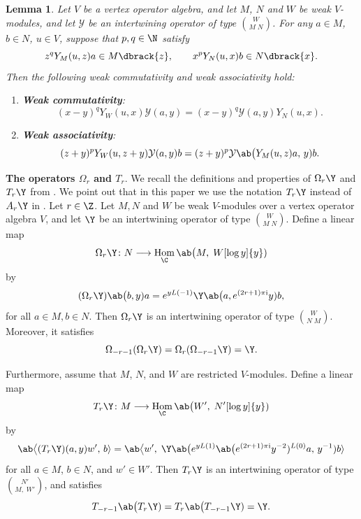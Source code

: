 \documentclass[12pt, english]{article}
\numberwithin{equation}{section}
\DeclareMathOperator{\Hom}{Hom}
\theoremstyle{plain}
\newtheorem{lemma}{Lemma}[section]
\theoremstyle{definition}
\theoremstyle{remark}
\begin{document}
	\begin{lemma}
		Let $V$ be a vertex operator algebra, and let $M$, $N$ and $W$ be weak $V$-modules, and let $\mathcal{Y}$ be an intertwining operator of type $\binom{W}{M\;N}$.
		For any $a \in M$, $b \in N$, $u \in V$, suppose that $p, q \in \N$ satisfy
		\[
		z^q Y_{M}(u, z) a \in M\dbrack{z}, \qquad x^p Y_{N}(u, x) b \in N\dbrack{x}.
		\]
		Then the following \emph{weak commutativity} and \emph{weak associativity} hold:
		\begin{enumerate}[label=(\arabic*),ref=\arabic*]
			\item \textbf{Weak commutativity}:
			\[
			(x-y)^q Y_{W}(u, x) \mathcal{Y}(a, y) = (x-y)^q \mathcal{Y}(a, y) Y_{N}(u, x).
			\]
			\item \textbf{Weak associativity}:
			\[
			(z+y)^p Y_{W}(u, z+y) \mathcal{Y}(a, y) b = (z+y)^p \mathcal{Y} \ab\big(Y_{M}(u, z) a, \, y) b.
			\]
		\end{enumerate}
	\end{lemma}
	
	\vspace{1\baselineskip}
	
	\noindent \textbf{ The operators $\Omega_r$ and $T_r$}.
	We recall the definitions and properties of $\Omega_r\Y$ and $T_r\Y$ from \cite{HLZ10II, FHL93}.
	We point out that in this paper we use the notation $T_r\Y$ instead of $A_r\Y$ in \cite{HLZ10II}.
	Let $r \in \Z$. Let $M, N$ and $W$ be weak $V$-modules over a vertex operator algebra $V$, and
	let $\Y$ be an intertwining operator of type $\binom{W}{M \; N}$. Define a linear map
	\[
	\Omega_r \Y \colon N \longrightarrow \Hom_{\C} \ab\big(M, \; W [\log y] \{y\})
	\]
	by
	\begin{equation} \label{eq:skew-symmetry-transform}
		(\Omega_r \Y) \ab\big(b, y) a = e^{yL(-1)} \Y \ab\big(a, e^{ (2r+1) \pi \mathrm{i}}y) b,
	\end{equation}
	for all $ a \in M, b \in N.$
	Then $\Omega_r\Y$ is an intertwining operator of type  $\binom{W}{N \; M}$.
	Moreover, it satisfies
	\[
	\Omega_{-r-1} (\Omega_r \Y) = \Omega_{r} (\Omega_{-r-1}\Y) = \Y.
	\]
	
	Furthermore, assume that $M$, $N$, and $W$ are restricted $V$-modules. Define a linear map
	\[
	T_r\Y\colon M \longrightarrow \Hom_{\C} \ab\big(W^\prime, \; N^\prime [\log y] \{y\})
	\]
	by
	\begin{equation}\label{eq:contragredient-transform}
		\ab\big\langle(T_r\Y) (a, y) w^{\prime}, \, b\rangle
		= \ab\big\langle w^{\prime}, \; \Y \ab\big(e^{yL(1)} \ab\big(e^{(2r+1) \pi\mathrm{i}} y^{-2})^{L(0)} a, \, y^{-1}) b \rangle
	\end{equation}
	for all $a \in M$, $b \in N$, and $w' \in W'$. Then $T_r\Y$ is an intertwining operator of type $\binom{N'}{M, \; W'}$,
	and satisfies
	\[
	T_{-r-1} \ab\big(T_r\Y) = T_{r} \ab\big(T_{-r-1}\Y) = \Y.
	\]
	
\end{document}
